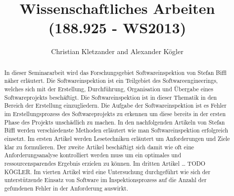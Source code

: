 \documentclass{llncs}
\begin{document}
\pagestyle{plain}

\title{Wissenschaftliches Arbeiten (188.925 - WS2013)}


\author{Christian Kletzander and Alexander Kögler}


\maketitle

\begin{abstract}
In dieser Seminararbeit wird das Forschungsgebiet Softwareinspektion von Stefan Biffl näher erläutert. Die Softwareinspektion ist ein Teilgebiet des Softwareengineerings, welches sich mit der Erstellung, Durchführung, Organisation und Übergabe eines Softwareprojekts beschäftigt. Die Softwareinspektion ist in dieser Thematik in den Bereich der Erstellung einzugliedern. Die Aufgabe der Softwareinspektion ist es Fehler im Erstellungsprozess des Softwareprojekts zu erkennen um diese bereits in der ersten Phase des Projekts unschädlich zu machen. In den nachfolgenden Artikeln von Stefan Biffl werden verschiedenste Methoden erläutert wie man Softwareinspektion erfolgreich einsetzt. Im ersten Artikel werden Lesetechniken erläutert um Anforderungen und Ziele klar zu formulieren. Der zweite Artikel beschäftigt sich damit wie oft eine Anforderungsanalyse kontrolliert werden muss um ein optimales und ressourcensparendes Ergebnis erzielen zu können. Im dritten Artikel … TODO KÖGLER. Im vierten Artikel wird eine Untersuchung durchgeführt wie sich der unterstützende Einsatz von Software im Inspektionsprozess auf die Anzahl der gefundenen Fehler in der Anforderung auswirkt.
\end{abstract}

\tableofcontents
\newpage
\end{document}
